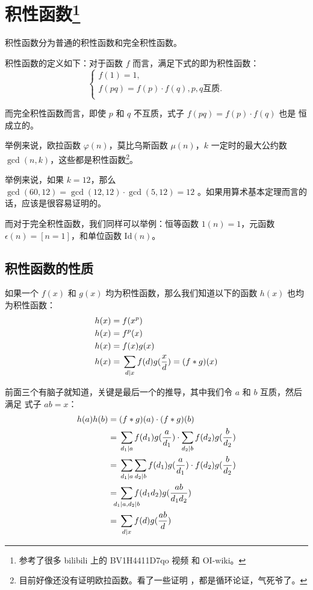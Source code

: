 
\section[积性函数]{积性函数\footnote{参考了很多 bilibili 上的 BV1H4411D7qo 视频
和 OI-wiki。}}\label{sec:积性函数}
积性函数分为普通的积性函数和完全积性函数。

积性函数的定义如下：对于函数 $f$ 而言，满足下式的即为积性函数：
$$
\begin{cases}
    f(1)  = 1,                                 \\
    f(pq) = f(p) \cdot f(q), p, q \text{互质}. \\
\end{cases}
$$

而完全积性函数而言，即使 $p$ 和 $q$ 不互质，式子 $f(pq) = f(p) \cdot f(q)$ 也是
恒成立的。

举例来说，欧拉函数 $\varphi(n)$，莫比乌斯函数 $\mu(n)$，$k$ 一定时的最大公约数
$\gcd(n, k)$，这些都是积性函数\footnote{目前好像还没有证明欧拉函数。看了一些证明
，都是循环论证，气死爷了。}。

举例来说，如果 $k=12$，那么 $\gcd(60, 12) = \gcd(12, 12) \cdot \gcd(5, 12) = 12$
。如果用算术基本定理而言的话，应该是很容易证明的。

而对于完全积性函数，我们同样可以举例：恒等函数 $1(n) = 1$，元函数 $\epsilon(n) =
[n = 1]$，和单位函数 $\mathrm{Id}(n)$。


\subsection{积性函数的性质}
如果一个 $f(x)$ 和 $g(x)$ 均为积性函数，那么我们知道以下的函数 $h(x)$ 也均为积性函数：
\begin{align*}
    h(x) = {} & f(x^p) \\
    h(x) = {} & f^p(x) \\
    h(x) = {} & f(x)g(x) \\
    h(x) = {} & \sum_{d \mid x} f(d)g({x \over d}) = (f * g)(x)
\end{align*}

前面三个有脑子就知道，关键是最后一个的推导，其中我们令 $a$ 和 $b$ 互质，然后满足
式子 $ab = x$：
\begin{align*}
    h(a)h(b) = {} & (f*g)(a) \cdot (f*g)(b) \\
             = {} & \sum_{d_1 \mid a} f(d_1)g({a \over d_1}) \cdot \sum_{d_2
                    \mid b} f(d_2)g({b \over d_2}) \\
             = {} & \sum_{d_1 \mid a} \sum_{d_2 \mid b} f(d_1)g({a \over d_1})
                    \cdot f(d_2)g({b \over d_2})\\
             = {} & \sum_{\mathclap{d_1 \mid a, d_2 \mid b}} f(d_1 d_2) g({ab \over d_1
                    d_2}) \\
             = {} & \sum_{d \mid x} f(d) g({ab \over d})
\end{align*}



